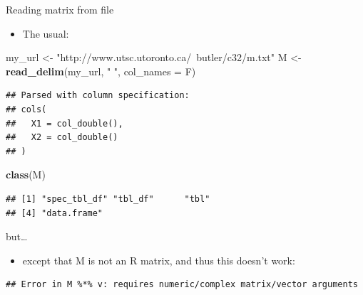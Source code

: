 \documentclass[ignorenonframetext,]{beamer}
\newenvironment{Shaded}{\begin{snugshade}}{\end{snugshade}}
\newcommand{\DataTypeTok}[1]{\textcolor[rgb]{0.13,0.29,0.53}{#1}}
\newcommand{\DecValTok}[1]{\textcolor[rgb]{0.00,0.00,0.81}{#1}}
\newcommand{\KeywordTok}[1]{\textcolor[rgb]{0.13,0.29,0.53}{\textbf{#1}}}
\newcommand{\NormalTok}[1]{#1}
\newcommand{\OperatorTok}[1]{\textcolor[rgb]{0.81,0.36,0.00}{\textbf{#1}}}
\newcommand{\StringTok}[1]{\textcolor[rgb]{0.31,0.60,0.02}{#1}}
\providecommand{\tightlist}{%
  \setlength{\itemsep}{0pt}\setlength{\parskip}{0pt}}
\begin{document}
\begin{frame}[fragile]{Reading matrix from file}
\protect\hypertarget{reading-matrix-from-file}{}

\begin{itemize}
\tightlist
\item
  The usual:
\end{itemize}

\begin{Shaded}
\begin{Highlighting}[]
\NormalTok{my_url <-}\StringTok{ "http://www.utsc.utoronto.ca/~butler/c32/m.txt"}
\NormalTok{M <-}\StringTok{ }\KeywordTok{read_delim}\NormalTok{(my_url, }\StringTok{" "}\NormalTok{, }\DataTypeTok{col_names =}\NormalTok{ F)}
\end{Highlighting}
\end{Shaded}

\begin{verbatim}
## Parsed with column specification:
## cols(
##   X1 = col_double(),
##   X2 = col_double()
## )
\end{verbatim}

\begin{Shaded}
\begin{Highlighting}[]
\KeywordTok{class}\NormalTok{(M)}
\end{Highlighting}
\end{Shaded}

\begin{verbatim}
## [1] "spec_tbl_df" "tbl_df"      "tbl"        
## [4] "data.frame"
\end{verbatim}

\end{frame}

\begin{frame}[fragile]{but\ldots{}}
\protect\hypertarget{but-1}{}

\begin{itemize}
\tightlist
\item
  except that M is not an R matrix, and thus this doesn't work:
\end{itemize}

\begin{Shaded}
\end{Shaded}

\begin{verbatim}
## Error in M %*% v: requires numeric/complex matrix/vector arguments
\end{verbatim}

\end{frame}
\end{document}
